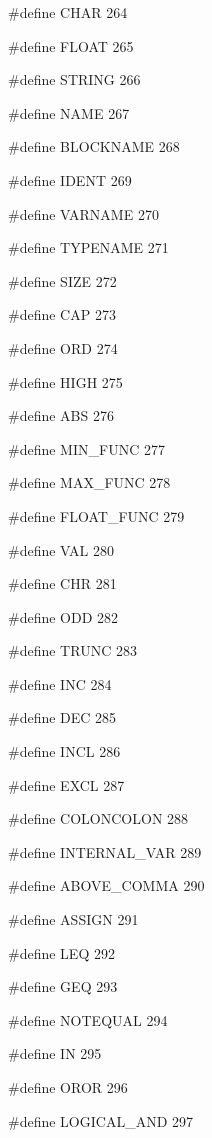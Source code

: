 \medskip
{\stt \#define CHAR 264}

\medskip
{\stt \#define FLOAT 265}

\medskip
{\stt \#define STRING 266}

\medskip
{\stt \#define NAME 267}

\medskip
{\stt \#define BLOCKNAME 268}

\medskip
{\stt \#define IDENT 269}

\medskip
{\stt \#define VARNAME 270}

\medskip
{\stt \#define TYPENAME 271}

\medskip
{\stt \#define SIZE 272}

\medskip
{\stt \#define CAP 273}

\medskip
{\stt \#define ORD 274}

\medskip
{\stt \#define HIGH 275}

\medskip
{\stt \#define ABS 276}

\medskip
{\stt \#define MIN\_FUNC 277}

\medskip
{\stt \#define MAX\_FUNC 278}

\medskip
{\stt \#define FLOAT\_FUNC 279}

\medskip
{\stt \#define VAL 280}

\medskip
{\stt \#define CHR 281}

\medskip
{\stt \#define ODD 282}

\medskip
{\stt \#define TRUNC 283}

\medskip
{\stt \#define INC 284}

\medskip
{\stt \#define DEC 285}

\medskip
{\stt \#define INCL 286}

\medskip
{\stt \#define EXCL 287}

\medskip
{\stt \#define COLONCOLON 288}

\medskip
{\stt \#define INTERNAL\_VAR 289}

\medskip
{\stt \#define ABOVE\_COMMA 290}

\medskip
{\stt \#define ASSIGN 291}

\medskip
{\stt \#define LEQ 292}

\medskip
{\stt \#define GEQ 293}

\medskip
{\stt \#define NOTEQUAL 294}

\medskip
{\stt \#define IN 295}

\medskip
{\stt \#define OROR 296}

\medskip
{\stt \#define LOGICAL\_AND 297}


